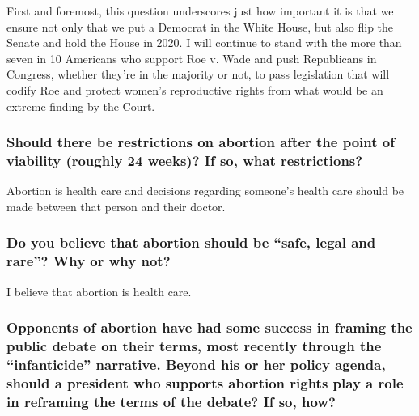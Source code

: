 First and foremost, this question underscores just how important it is
that we ensure not only that we put a Democrat in the White House, but
also flip the Senate and hold the House in 2020. I will continue to
stand with the more than seven in 10 Americans who support Roe v. Wade
and push Republicans in Congress, whether they're in the majority or
not, to pass legislation that will codify Roe and protect women's
reproductive rights from what would be an extreme finding by the Court.

\hypertarget{should-there-be-restrictions-on-abortion-after-the-point-of-viability-roughly-24-weeks-if-so-what-restrictions-1}{%
\subsubsection{Should there be restrictions on abortion after the point
of viability (roughly 24 weeks)? If so, what
restrictions?}\label{should-there-be-restrictions-on-abortion-after-the-point-of-viability-roughly-24-weeks-if-so-what-restrictions-1}}

Abortion is health care and decisions regarding someone's health care
should be made between that person and their doctor.

\hypertarget{do-you-believe-that-abortion-should-be-safe-legal-and-rare-why-or-why-not-1}{%
\subsubsection{Do you believe that abortion should be ``safe, legal and
rare''? Why or why
not?}\label{do-you-believe-that-abortion-should-be-safe-legal-and-rare-why-or-why-not-1}}

I believe that abortion is health care.

\hypertarget{opponents-of-abortion-have-had-some-success-in-framing-the-public-debate-on-their-terms-most-recently-through-the-infanticide-narrative-beyond-his-or-her-policy-agenda-should-a-president-who-supports-abortion-rights-play-a-role-in-reframing-the-terms-of-the-debate-if-so-how-1}{%
\subsubsection{Opponents of abortion have had some success in framing
the public debate on their terms, most recently through the
``infanticide'' narrative. Beyond his or her policy agenda, should a
president who supports abortion rights play a role in reframing the
terms of the debate? If so,
how?}\label{opponents-of-abortion-have-had-some-success-in-framing-the-public-debate-on-their-terms-most-recently-through-the-infanticide-narrative-beyond-his-or-her-policy-agenda-should-a-president-who-supports-abortion-rights-play-a-role-in-reframing-the-terms-of-the-debate-if-so-how-1}}

